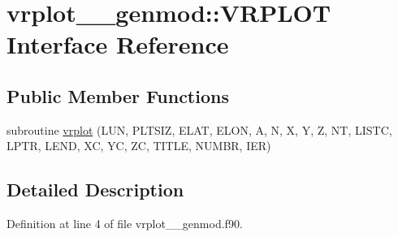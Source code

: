 \hypertarget{interfacevrplot____genmod_1_1VRPLOT}{\section{vrplot\+\_\+\+\_\+genmod\+:\+:V\+R\+P\+L\+O\+T Interface Reference}
\label{interfacevrplot____genmod_1_1VRPLOT}
}
\subsection*{Public Member Functions}
\begin{DoxyCompactItemize}
\item 
subroutine \hyperlink{interfacevrplot____genmod_1_1VRPLOT_a05cde86bdce75204c9db99e6c628ed9d}{vrplot} (L\+U\+N, P\+L\+T\+S\+I\+Z, E\+L\+A\+T, E\+L\+O\+N, A, N, X, Y, Z, N\+T, L\+I\+S\+T\+C, L\+P\+T\+R, L\+E\+N\+D, X\+C, Y\+C, Z\+C, T\+I\+T\+L\+E, N\+U\+M\+B\+R, I\+E\+R)
\end{DoxyCompactItemize}


\subsection{Detailed Description}


Definition at line 4 of file vrplot\+\_\+\+\_\+genmod.\+f90.



